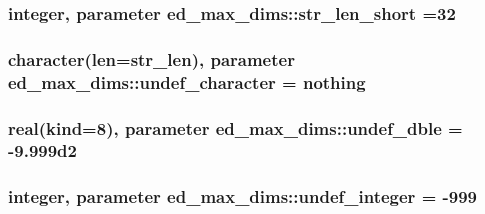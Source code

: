 \subsubsection[{\texorpdfstring{str\+\_\+len\+\_\+short}{str_len_short}}]{\setlength{\rightskip}{0pt plus 5cm}integer, parameter ed\+\_\+max\+\_\+dims\+::str\+\_\+len\+\_\+short =32}\hypertarget{namespaceed__max__dims_aa0b83676744833979e6ea1e266859852}{}\label{namespaceed__max__dims_aa0b83676744833979e6ea1e266859852}
\subsubsection[{\texorpdfstring{undef\+\_\+character}{undef_character}}]{\setlength{\rightskip}{0pt plus 5cm}character(len={\bf str\+\_\+len}), parameter ed\+\_\+max\+\_\+dims\+::undef\+\_\+character = \textquotesingle{}nothing\textquotesingle{}}\hypertarget{namespaceed__max__dims_ae43730f1b622bf8a25fe78b4e8a8dd8f}{}\label{namespaceed__max__dims_ae43730f1b622bf8a25fe78b4e8a8dd8f}
\subsubsection[{\texorpdfstring{undef\+\_\+dble}{undef_dble}}]{\setlength{\rightskip}{0pt plus 5cm}real(kind=8), parameter ed\+\_\+max\+\_\+dims\+::undef\+\_\+dble = -\/9.\+999d2}\hypertarget{namespaceed__max__dims_afb7d078e8eb6e8094ff979414b2500cf}{}\label{namespaceed__max__dims_afb7d078e8eb6e8094ff979414b2500cf}
\subsubsection[{\texorpdfstring{undef\+\_\+integer}{undef_integer}}]{\setlength{\rightskip}{0pt plus 5cm}integer, parameter ed\+\_\+max\+\_\+dims\+::undef\+\_\+integer = -\/999}\hypertarget{namespaceed__max__dims_a5cb1206cd6171b2aac2b47b056fcde4b}{}\label{namespaceed__max__dims_a5cb1206cd6171b2aac2b47b056fcde4b}
